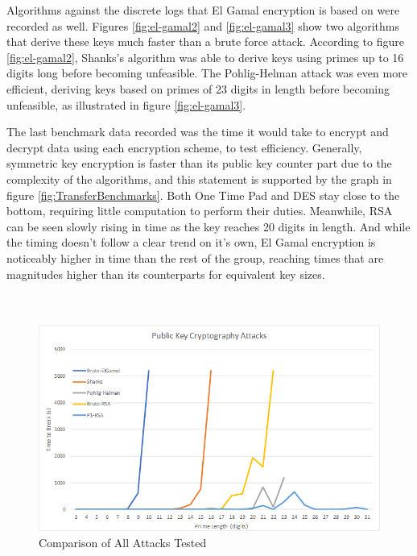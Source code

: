 \documentclass[12pt]{report}
\begin{document}
Algorithms against the discrete logs that El Gamal encryption is based on were recorded as well. Figures \ref{fig:el-gamal2} and \ref{fig:el-gamal3} show two algorithms
that derive these keys much faster than a brute force attack. According to figure \ref{fig:el-gamal2}, Shanks's algorithm was able to derive keys using primes up to 16
digits long before becoming unfeasible. The Pohlig-Helman attack was even more efficient, deriving keys based on primes of 23 digits in length before becoming unfeasible,
as illustrated in figure \ref{fig:el-gamal3}.

The last benchmark data recorded was the time it would take to encrypt and decrypt data using each encryption scheme, to test efficiency. Generally, symmetric key encryption
is faster than its public key counter part due to the complexity of the algorithms, and this statement is supported by the graph in figure \ref{fig:TransferBenchmarks}. Both
One Time Pad and DES stay close to the bottom, requiring little computation to perform their duties. Meanwhile, RSA can be seen slowly rising in time as the key reaches 20
digits in length. And while the timing doesn't follow a clear trend on it's own, El Gamal encryption is noticeably higher in time than the rest of the group, reaching times
that are magnitudes higher than its counterparts for equivalent key sizes.
\\
\\
\\

\begin{figure}[hp!] %
    \begin{center}
        \includegraphics[width=0.85\linewidth]{AllAttack.PNG}
        \caption{Comparison of All Attacks Tested}
        \label{fig:allattack}
    \end{center}
\end{figure}
\end{document}
